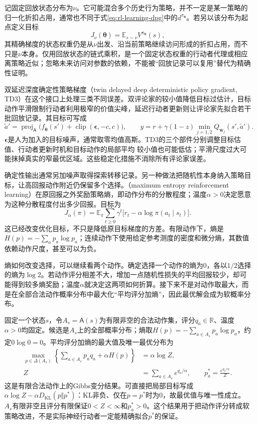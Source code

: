 记固定回放状态分布为$\nu$。它可能混合多个历史行为策略，并不一定是某一策略的归一化折扣占用，通常也不同于式\eqref{eq:rl-learning-dpg}中的$d^{\pi_{\bm\theta}}$。若另以该分布为起点定义目标
\[
  J_\nu(\bm\theta)=\mathbb E_{s\sim\nu}V^{\pi_{\bm\theta}}(s),
\]
其精确梯度的状态权重仍是从$\nu$出发、沿当前策略继续访问形成的折扣占用，而不只是$\nu$本身。仅用回放状态的链式乘积，是一个固定状态权重的行动者代理或相应离策略近似；忽略未来访问对参数的依赖，不能被“回放记录可以复用”替代为精确性证明。

双延迟深度确定性策略梯度（twin delayed deep deterministic policy gradient, TD3）在这个接口上处理三类不同误差。双评论家的较小值降低目标过估计，目标动作平滑限制行动者利用极窄的价值尖峰，延迟行动者更新则让评论家先拟合若干批回放记录。其目标可写成
\[
  \widetilde a'
    =\operatorname{proj}_{\mathsf A}
        \bigl(f_{\bar{\bm\theta}}(s')
              +\operatorname{clip}(\bm\epsilon,-c,c)\bigr),
  \qquad
  y=r+\gamma(1-z)\min_{j=1,2}Q_{\bar{\bm w}_j}(s',\widetilde a').
\]
$\bm\epsilon$是人为加入的目标噪声，通常取零均值高斯。TD3的三个部件分别调整目标估值、行动者更新时机和目标动作的局部平均
较小值也可能低估；平滑尺度过大可能抹掉真实的窄最优区域。这些稳定化措施不消除所有评论家误差。

确定性输出通常另加噪声取得探索转移记录。另一种做法把随机性本身纳入策略目标，让高回报动作附近仍保留多个选择。（maximum entropy reinforcement learning）在原回报之外奖励策略熵，即动作分布的分散程度；温度$\alpha>0$决定愿意为这种分散程度付出多少回报。目标为
\begin{equation}
  J_\alpha(\pi)=\mathbb E_\pi\sum_{t\geq0}\gamma^t
      \bigl[r_t-\alpha\log\pi(a_t\mid s_t)\bigr].
  \label{eq:rl-learning-maxent-objective}
\end{equation}
这已经改变优化目标，不只是降低原目标梯度的方差。有限动作下，熵是
$H(p)=-\sum_a p_a\log p_a$；连续动作下使用给定参考测度的密度和微分熵，其数值依赖动作尺度，甚至可以为负。

熵如何改变选择，可以继续看两个动作。确定选择一个动作的熵为0，各以$1/2$选择的熵为$\log2$。若动作评分相差不大，增加一点随机性损失的平均回报较少，却可能得到较多熵奖励；温度$\alpha$就决定这两项如何折算。接下来不是对动作取最大，而是在全部合法动作概率分布中最大化“平均评分加熵”，因此最优解会成为软概率分布。

固定一个状态$s$，令$A_s=\mathsf A(s)$为有限非空的合法动作集，评分$q_a\in\mathbb R$、温度$\alpha>0$均固定。候选是$A_s$上的全部概率分布；熵取$H(p)=-\sum_{a\in A_s}p_a\log p_a$，约定$0\log0=0$。平均评分加熵的最大值及唯一最优分布为
\[
 \begin{aligned}
 \max_{p\in\Delta(A_s)}
   \left\{\sum_{a\in A_s}p_aq_a+\alpha H(p)\right\}
  &=\alpha\log Z,\\
 Z&=\sum_{a\in A_s}e^{q_a/\alpha},\qquad
 p_a^*=\frac{e^{q_a/\alpha}}Z.
 \end{aligned}
\]
这是有限合法动作上的Gibbs变分结果。可直接把局部目标写成$\alpha\log Z-\alpha D_{\mathrm{KL}}(p\Vert p^*)$：KL非负、仅在$p=p^*$时为0，故最优值与唯一性成立。$A_s$有限非空且评分有限保证$0<Z<\infty$和$p_a^*>0$。这个结果用于把动作评分转成软策略改进，不是实际神经行动者一定能精确拟合$p^*$的保证。

